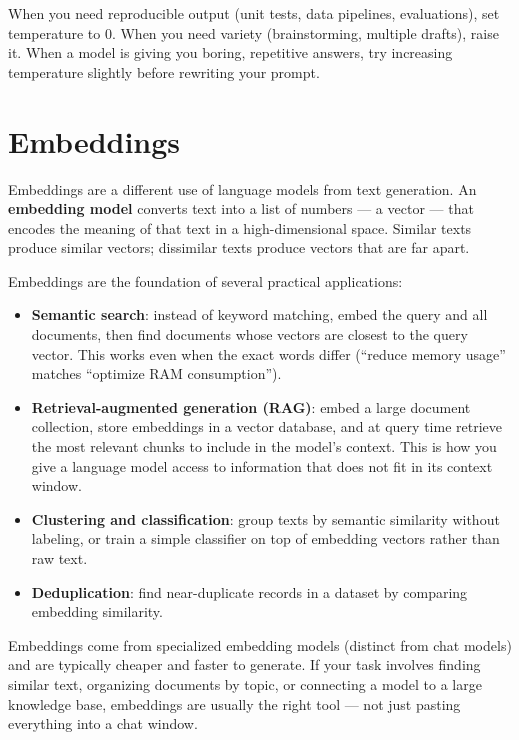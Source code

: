 When you need reproducible output (unit tests, data pipelines, evaluations), set temperature to 0. When you need variety (brainstorming, multiple drafts), raise it. When a model is giving you boring, repetitive answers, try increasing temperature slightly before rewriting your prompt.

\section{Embeddings}

Embeddings are a different use of language models from text generation. An \textbf{embedding model} converts text into a list of numbers --- a vector --- that encodes the meaning of that text in a high-dimensional space. Similar texts produce similar vectors; dissimilar texts produce vectors that are far apart.


Embeddings are the foundation of several practical applications:

\begin{itemize}[noitemsep,topsep=0pt]
  \item \textbf{Semantic search}: instead of keyword matching, embed the query and all documents, then find documents whose vectors are closest to the query vector. This works even when the exact words differ (``reduce memory usage'' matches ``optimize RAM consumption'').
  \item \textbf{Retrieval-augmented generation (RAG)}: embed a large document collection, store embeddings in a vector database, and at query time retrieve the most relevant chunks to include in the model's context. This is how you give a language model access to information that does not fit in its context window.
  \item \textbf{Clustering and classification}: group texts by semantic similarity without labeling, or train a simple classifier on top of embedding vectors rather than raw text.
  \item \textbf{Deduplication}: find near-duplicate records in a dataset by comparing embedding similarity.
\end{itemize}

Embeddings come from specialized embedding models (distinct from chat models) and are typically cheaper and faster to generate. If your task involves finding similar text, organizing documents by topic, or connecting a model to a large knowledge base, embeddings are usually the right tool --- not just pasting everything into a chat window.

